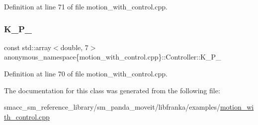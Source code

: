 Definition at line 71 of file motion\+\_\+with\+\_\+control.\+cpp.

\mbox{\label{classanonymous__namespace_02motion__with__control_8cpp_03_1_1Controller_a5d89d12c8a2909c46bb45adf35073db2}} 
\subsubsection{\texorpdfstring{K\+\_\+\+P\+\_\+}{K\_P\_}}
{\footnotesize\ttfamily const std\+::array$<$double, 7$>$ anonymous\+\_\+namespace\{motion\+\_\+with\+\_\+control.\+cpp\}\+::Controller\+::\+K\+\_\+\+P\+\_\+\hspace{0.3cm}{\ttfamily [private]}}



Definition at line 70 of file motion\+\_\+with\+\_\+control.\+cpp.



The documentation for this class was generated from the following file\+:\begin{DoxyCompactItemize}
\item 
smacc\+\_\+sm\+\_\+reference\+\_\+library/sm\+\_\+panda\+\_\+moveit/libfranka/examples/\hyperlink{motion__with__control_8cpp}{motion\+\_\+with\+\_\+control.\+cpp}\end{DoxyCompactItemize}
